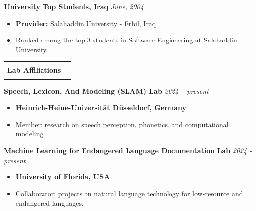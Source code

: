 \documentclass[11pt,a4paper]{article}
\makeatletter
\newcommand{\inlinesection}[1]{%
  \vspace{1em}
  \noindent
  \begin{tabular*}{\linewidth}{@{}l@{\extracolsep{\fill}}r@{}}
    \Large\textbf{\color{darkblue} #1} & \color{darkblue}\rule{0.7\linewidth}{1.2pt} \\
  \end{tabular*}
  \par\vspace{0.7em}
}
\makeatother
\begin{document}
\begin{list}{}{
  \setlength{\leftmargin}{0pt}
  \setlength{\labelwidth}{0pt}
  \setlength{\itemindent}{0pt}
  \setlength{\parsep}{0pt}
  \setlength{\itemsep}{1em} %
}
\item \textcolor{RedViolet}{\textbf{University Top Students, Iraq} \hfill \textit{June, 2004}} \vspace{0.5em}
      \begin{itemize}
          \item \textbf{Provider:} Salahaddin University - Erbil, Iraq 
      \end{itemize}
      \begin{itemize}
          \item Ranked among the top 3 students in Software Engineering at Salahaddin University.
      \end{itemize}
      
\end{list}


\inlinesection{Lab Affiliations}
\begin{list}{}{
  \setlength{\leftmargin}{0pt}
  \setlength{\labelwidth}{0pt}
  \setlength{\itemindent}{0pt}
  \setlength{\parsep}{0pt}
  \setlength{\itemsep}{1em} %
}
\item \textcolor{RedViolet}{\textbf{Speech, Lexicon, And Modeling (SLAM) Lab} \hfill \textit{2024 – present}} \vspace{0.5em}
      \begin{itemize}
          \item \textbf {Heinrich-Heine-Universität Düsseldorf, Germany}
      \end{itemize}
      \begin{itemize}
          \item Member; research on speech perception, phonetics, and computational modeling.
      \end{itemize}
            

\item \textcolor{RedViolet}{\textbf{Machine Learning for Endangered Language Documentation Lab} \hfill \textit{2024 - present}} \vspace{0.5em}
      \begin{itemize}
          \item \textbf {University of Florida, USA}
      \end{itemize}
    \begin{itemize}
        \item Collaborator; projects on natural language technology for low-resource and endangered languages.
    \end{itemize}

 
\end{list}
\end{document}
